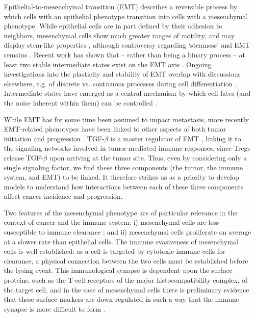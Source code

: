 \documentclass[11pt]{article}
\begin{document}
\par
Epithelial-to-mesenchymal transition (EMT) describes a reversible process by which cells with an epithelial phenotype transition into cells with a mesenchymal phenotype.
While epithelial cells are in part defined by their adhesion to neighbors, mesenchymal cells show much greater ranges of motility, and may display stem-like properties \cite{nieto2016emt}, although controversy regarding `stemness' and EMT remains \cite{nie18_stem, sha19_intermediate}.  
Recent work has shown that -- rather than being a binary process -- at least two stable intermediate states exist on the EMT axis \cite{hong2015ovol2, jolly15_coupling}. Ongoing investigations into the plasticity and stability of EMT overlap with discussions elsewhere, e.g. of discrete vs. continuous processes during cell differentiation \cite{moris16_transition}. Intermediate states have emerged as a central mechanism by which cell fates (and the noise inherent within them) can be controlled \cite{maclean18_exploring, ta16_controlling, rackauckas18_meanindependent}. 
\par 
While EMT has for some time been assumed to impact metastasis, more recently EMT-related phenotypes have been linked to other aspects of both tumor initiation and progression \cite{nieto2016emt}.  TGF-$\beta$ is a master regulator of EMT \cite{lim2012epithelial}, linking it to the signaling networks involved in tumor-mediated immune responses, since Tregs release TGF-$\beta$ upon arriving at the tumor site\cite{terry2017new}. Thus, even by considering only a single signaling factor, we find these three components (the tumor, the immune system, and EMT) to be linked. It therefore strikes us as a priority to develop models to understand how interactions between each of these three components affect cancer incidence and progression.
\par
Two features of the mesenchymal phenotype are of particular relevance in the context of cancer and the immune system: i) mesenchymal cells are less susceptible to immune clearance \cite{terry2017new}; and ii) mesenchymal cells proliferate on average at a slower rate than epithelial cells.
The immune evasiveness of mesenchymal cells is well-established: as a cell is targeted by cytotoxic immune cells for clearance, a physical connection between the two cells must be established before the lysing event.
This immunological synapse is dependent upon the surface proteins, such as the T-cell receptors of the major histocompatibility complex, of the target cell, and in the case of mesenchymal cells there is preliminary evidence that these surface markers are down-regulated in such a way that the immune synapse is more difficult to form \cite{terry2017new}.
\end{document}
